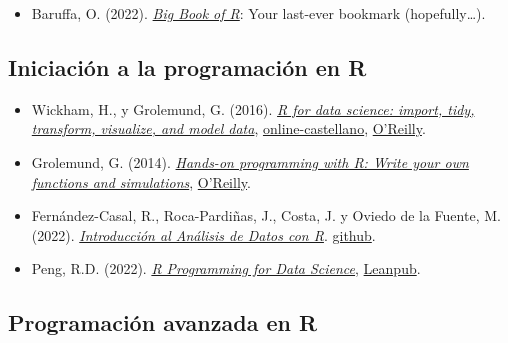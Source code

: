 \documentclass[
]{book}
\providecommand{\tightlist}{%
  \setlength{\itemsep}{0pt}\setlength{\parskip}{0pt}}
\theoremstyle{break}
\theoremstyle{nonumberplain}
\begin{document}
\begin{itemize}
\tightlist
\item
  Baruffa, O. (2022). \emph{\href{https://www.bigbookofr.com}{Big Book of R}}: Your last-ever bookmark (hopefully\ldots).
\end{itemize}

\subsection*{Iniciación a la programación en R}\label{iniciaciuxf3n-a-la-programaciuxf3n-en-r}

\begin{itemize}
\item
  Wickham, H., y Grolemund, G. (2016). \emph{\href{http://r4ds.had.co.nz}{R for data science: import, tidy, transform, visualize, and model data}}, \href{https://es.r4ds.hadley.nz}{online-castellano}, \href{http://shop.oreilly.com/product/0636920034407.do}{O'Reilly}.
\item
  Grolemund, G. (2014). \emph{\href{https://rstudio-education.github.io/hopr}{Hands-on programming with R: Write your own functions and simulations}}, \href{http://shop.oreilly.com/product/0636920028574.do}{O'Reilly}.
\item
  Fernández-Casal, R., Roca-Pardiñas, J., Costa, J. y Oviedo de la Fuente, M. (2022). \emph{\href{https://rubenfcasal.github.io/intror}{Introducción al Análisis de Datos con R}}. \href{https://github.com/rubenfcasal/intror}{github}.
\item
  Peng, R.D. (2022). \emph{\href{https://bookdown.org/rdpeng/rprogdatascience}{R Programming for Data Science}}, \href{https://leanpub.com/rprogramming}{Leanpub}.
\end{itemize}

\subsection*{Programación avanzada en R}\label{programaciuxf3n-avanzada-en-r}
\end{document}
